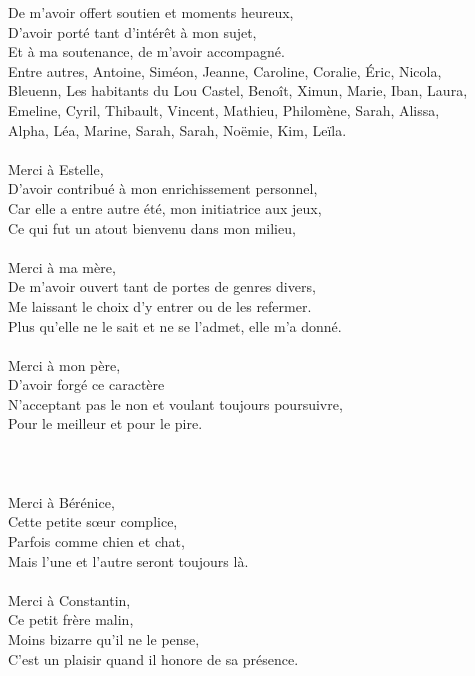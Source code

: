 \documentclass[english,a4paper,11pt,twoside]{StyleThese}
\begin{document}
De m'avoir offert soutien et moments heureux,\\
D'avoir porté tant d'intérêt à mon sujet,\\
Et à ma soutenance, de m'avoir accompagné.\\
Entre autres, Antoine, Siméon, Jeanne, Caroline, Coralie, Éric, Nicola,\\
Bleuenn, Les habitants  du Lou Castel, Benoît, Ximun, Marie, Iban, Laura,\\
Emeline, Cyril, Thibault, Vincent, Mathieu,  Philomène, Sarah, Alissa,\\
Alpha, Léa, Marine, Sarah, Sarah, Noëmie, Kim, Leïla.\\
\\
Merci à Estelle,\\
D'avoir contribué à mon enrichissement personnel,\\
Car elle a entre autre été, mon initiatrice aux jeux,\\
Ce qui fut un atout bienvenu dans mon milieu,\\
\\
Merci à ma mère,\\
De m'avoir ouvert tant de portes de genres divers,\\
Me laissant le choix d'y entrer ou de les refermer.\\
Plus qu'elle ne le sait et ne se l'admet, elle m'a donné.\\
\\
Merci à mon père,\\
D'avoir forgé ce caractère\\
N'acceptant pas le non et voulant toujours poursuivre,\\
Pour le meilleur et pour le pire.\\
\\
\\
\\
Merci à Bérénice,\\
Cette petite s\oe{}ur complice,\\
Parfois comme chien et chat,\\
Mais l'une et l'autre seront toujours là.\\
\\
Merci à Constantin,\\
Ce petit frère malin,\\
Moins bizarre qu'il ne le pense,\\
C'est un plaisir quand il honore de sa présence.\\
\\
\end{document}
